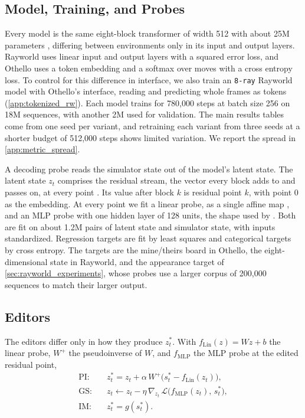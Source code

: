 \documentclass{article} %
\begin{document}
\subsection{Model, Training, and Probes}
Every model is the same eight-block transformer of width 512 with about 25M parameters \citep{vaswani2017attention}, differing between environments only in its input and output layers. Rayworld uses linear input and output layers with a squared error loss, and Othello uses a token embedding and a softmax over moves with a cross entropy loss. To control for this difference in interface, we also train an \texttt{8-ray} Rayworld model with Othello's interface, reading and predicting whole frames as tokens (\cref{app:tokenized_rw}). Each model trains for 780,000 steps at batch size 256 on 18M sequences, with another 2M used for validation. The main results tables come from one seed per variant, and retraining each variant from three seeds at a shorter budget of 512,000 steps shows limited variation. We report the spread in \cref{app:metric_spread}.


A decoding probe reads the simulator state out of the model's latent state. The latent state $z_t$ comprises the residual stream, the vector every block adds to and passes on, at every point \citep{elhage2021mathematical}. Its value after block $k$ is residual point $k$, with point 0 as the embedding. At every point we fit a linear probe, as a single affine map \citep{alain2017probes}, and an MLP probe with one hidden layer of 128 units, the shape used by \citet{li2023othello}. Both are fit on about 1.2M pairs of latent state and simulator state, with inputs standardized. Regression targets are fit by least squares and categorical targets by cross entropy. The targets are the mine/theirs board in Othello, the eight-dimensional state in Rayworld, and the appearance target of \cref{sec:rayworld_experiments}, whose probes use a larger corpus of 200,000 sequences to match their larger output.

\subsection{Editors}

The editors differ only in how they produce $z_t^*$. With $f_{\mathrm{Lin}}(z) = Wz + b$ the linear probe, $W^{+}$ the pseudoinverse of $W$, and $f_{\mathrm{MLP}}$ the MLP probe at the edited residual point,
\begin{align}
\text{PI:}\quad & z_t^* = z_t + \alpha\, W^{+}\big(s_t^* - f_{\mathrm{Lin}}(z_t)\big), \\
\text{GS:}\quad & z_t \leftarrow z_t - \eta\, \nabla_{z_t}\, \mathcal{L}\big(f_{\mathrm{MLP}}(z_t),\, s_t^*\big), \\
\text{IM:}\quad & z_t^* = g(s_t^*).
\end{align}
\end{document}
